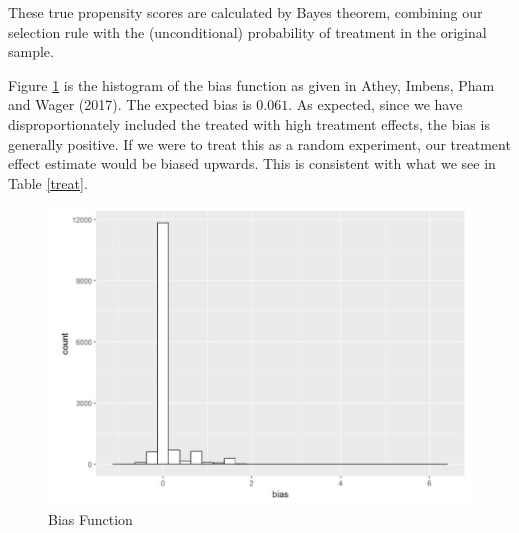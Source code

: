 \documentclass[paper=letter, fontsize=11pt]{scrartcl} %
\begin{document}
These true propensity scores are calculated by Bayes theorem, combining our selection rule with the (unconditional) probability of treatment in the original sample.

Figure \ref{bias} is the histogram of the bias function as given in Athey, Imbens, Pham and Wager (2017). The expected bias is $0.061$. As expected, since we have disproportionately included the treated with high treatment effects, the bias is generally positive. If we were to treat this as a random experiment, our treatment effect estimate would be biased upwards. This is consistent with what we see in Table \ref{treat}.

\begin{figure}[!ht]
\center
\caption{Bias Function  \label{bias}}
\includegraphics[scale=0.8]{figs/bias.jpg}
\end{figure}

\section{}

\section{}
\end{document}
